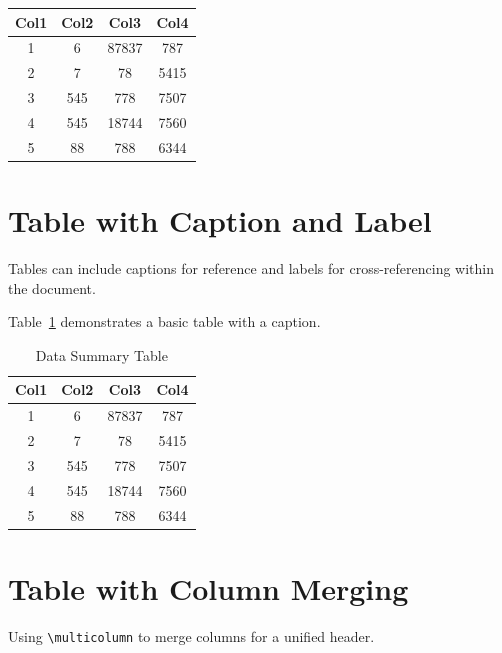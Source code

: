 \documentclass[12pt]{article}
\begin{document}
	\begin{center}
		\begin{tabular}{||c c c c||} 
			\hline
			\textbf{Col1} & \textbf{Col2} & \textbf{Col3} & \textbf{Col4} \\ [0.5ex] 
			\hline\hline
			1 & 6 & 87837 & 787 \\ 
			\hline
			2 & 7 & 78 & 5415 \\
			\hline
			3 & 545 & 778 & 7507 \\
			\hline
			4 & 545 & 18744 & 7560 \\
			\hline
			5 & 88 & 788 & 6344 \\ [1ex] 
			\hline
		\end{tabular}
	\end{center}
	
	\section{Table with Caption and Label}
	Tables can include captions for reference and labels for cross-referencing within the document.
	
	Table~\ref{table:data} demonstrates a basic table with a caption.
	
	\begin{table}[h!]
		\centering
		\caption{Data Summary Table}
		\label{table:data}
		\begin{tabular}{||c c c c||} 
			\hline
			\textbf{Col1} & \textbf{Col2} & \textbf{Col3} & \textbf{Col4} \\ [0.5ex] 
			\hline\hline
			1 & 6 & 87837 & 787 \\ 
			2 & 7 & 78 & 5415 \\
			3 & 545 & 778 & 7507 \\
			4 & 545 & 18744 & 7560 \\
			5 & 88 & 788 & 6344 \\ [1ex] 
			\hline
		\end{tabular}
	\end{table}
	
	\section{Table with Column Merging}
	Using \texttt{\textbackslash multicolumn} to merge columns for a unified header.
	
\end{document}
